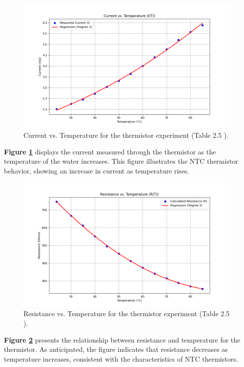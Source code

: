 \documentclass[journal]{IEEEtran}
\begin{document}
\begin{figure}[H]
    \centering
    \includegraphics[width=\linewidth]{output_plots/Current_vs_Temperature.png}
    \caption{Current vs. Temperature for the thermistor experiment (Table 2.5 \cite{lab_manual}).}
    \label{fig:current_vs_temperature}
\end{figure}
\textbf{Figure \ref{fig:current_vs_temperature}} displays the current measured through the thermistor as the temperature of the water increases. This figure illustrates the NTC thermistor behavior, showing an increase in current as temperature rises.

\begin{figure}[H]
    \centering
    \includegraphics[width=\linewidth]{output_plots/Resistance_vs_Temperature.png}
    \caption{Resistance vs. Temperature for the thermistor experiment (Table 2.5 ).}
    \label{fig:resistance_vs_temperature}
\end{figure}
\textbf{Figure \ref{fig:resistance_vs_temperature}} presents the relationship between resistance and temperature for the thermistor. As anticipated, the figure indicates that resistance decreases as temperature increases, consistent with the characteristics of NTC thermistors.
\end{document}
